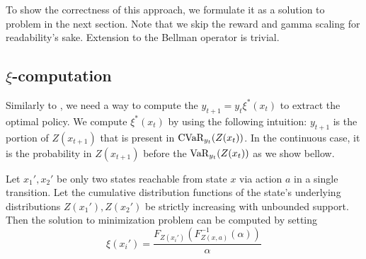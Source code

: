 To show the correctness of this approach, we formulate it as a solution to problem  in the next section. Note that we skip the reward and gamma scaling for readability's sake. Extension to the Bellman operator is trivial.

\subsection{$\xi$-computation}

Similarly to , we need a way to compute the $y_{t+1}=y_{t}\xi^*(x_t)$ to extract the optimal policy. We compute $\xi^*(x_t)$ by using the following intuition: $y_{t+1}$ is the portion of $Z(x_{t+1})$ that is present in $\text{CVaR}_{y_t}(Z(x_t))$. In the continuous case, it is the probability in $Z(x_{t+1})$ before the $\text{VaR}_{y_t}(Z(x_t))$ as we show bellow.
\begin{theorem}
Let $x_1', x_2'$ be only two states reachable from state $x$ via action $a$ in a single transition. Let the cumulative distribution functions of the state's underlying distributions $Z(x_1'), Z(x_2')$ be strictly increasing with unbounded support.
Then the solution to minimization problem  can be computed by setting
\begin{equation}\label{eqn:xi-claim}
\xi ( x_i' ) = \dfrac{F_{Z(x_i')}\left(F^{-1}_{Z(x, a)}(\alpha)\right)}{\alpha} 
\end{equation}
\end{theorem}

